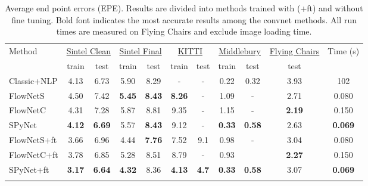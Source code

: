 \documentclass[10pt,twocolumn,letterpaper]{article}
\begin{document}
\begin{table}
\begin{center}
\begin{tabular}{lcccccccccc}
\Xhline{4\arrayrulewidth}
Method      & \multicolumn{2}{c}{\underline{Sintel Clean}} & \multicolumn{2}{c}{\underline{Sintel Final}} & \multicolumn{2}{c}{\underline{  \quad  KITTI \quad    }} & \multicolumn{2}{c}{\underline{Middlebury}} & \underline{Flying Chairs} & \multicolumn{1}{l}{Time (s)} \\
            & train            & test           & train            & test           & train        & test        & train           & test          & test          & \multicolumn{1}{l}{}   \\ \Xhline{4\arrayrulewidth}
Classic+NLP    & 4.13             & 6.73           & 5.90             & 8.29           & -         & -           & 0.22            & 0.32             & 3.93          & 102                         \\ \hline
FlowNetS    & 4.50             & 7.42           & \textbf{5.45}             & \textbf{8.43}           & \textbf{8.26}         & -           & 1.09            & -             & 2.71          & 0.080                         \\
FlowNetC    & 4.31             & 7.28           & 5.87             & 8.81           & 9.35         & -           & 1.15            & -             & \textbf{2.19}          & 0.150                         \\
SPyNet      & \textbf{4.12}             & \textbf{6.69}           & 5.57             & \textbf{8.43}           & 9.12         & -             & \textbf{0.33}            & \textbf{0.58}          & 2.63          & \textbf{0.069}                         \\ \hline
FlowNetS+ft & 3.66             & 6.96           & 4.44             & \textbf{7.76}           & 7.52         & 9.1         & 0.98            & -             & 3.04          & 0.080                         \\
FlowNetC+ft & 3.78             & 6.85           & 5.28             & 8.51           & 8.79         & -           & 0.93            &               & \textbf{2.27}          & 0.150                         \\
SPyNet+ft   & \textbf{3.17}             & \textbf{6.64}           & \textbf{4.32 }            & 8.36           & \textbf{4.13}         & \textbf{4.7}         & \textbf{0.33}            & \textbf{0.58}           & 3.07             & \textbf{0.069}                         \\  \Xhline{4\arrayrulewidth}
\end{tabular}
\end{center}
\caption{Average end point errors (EPE). Results are divided into methods trained with (+ft) and without fine tuning.  Bold font indicates the most accurate results among the convnet methods. All run times are measured on Flying Chairs and exclude image loading time.}
\label{tab:results}
\end{table}
\end{document}
